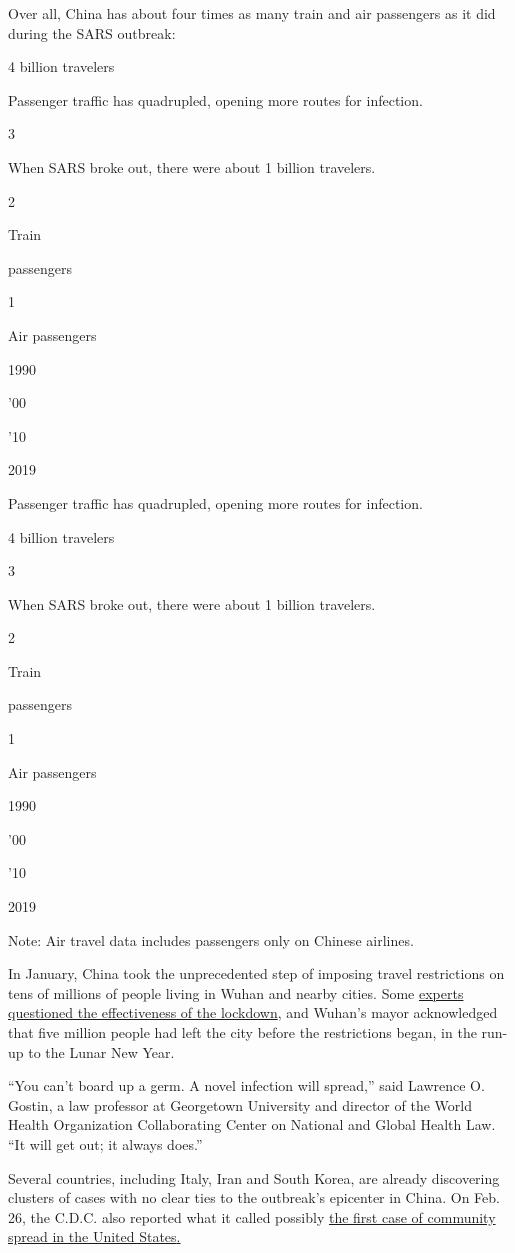 Over all, China has about four times as many train and air passengers as
it did during the SARS outbreak:

4 billion travelers

Passenger traffic has quadrupled, opening more routes for infection.

3

When SARS broke out, there were about 1 billion travelers.

2

Train

passengers

1

Air passengers

1990

'00

'10

2019

Passenger traffic has quadrupled, opening more routes for infection.

4 billion travelers

3

When SARS broke out, there were about 1 billion travelers.

2

Train

passengers

1

Air passengers

1990

'00

'10

2019

Note: Air travel data includes passengers only on Chinese airlines.

In January, China took the unprecedented step of imposing travel
restrictions on tens of millions of people living in Wuhan and nearby
cities. Some
\href{https://www.nytimes.com/2020/01/26/world/asia/coronavirus-wuhan-china-hubei.html}{experts
questioned the effectiveness of the lockdown}, and Wuhan's mayor
acknowledged that five million people had left the city before the
restrictions began, in the run-up to the Lunar New Year.

``You can't board up a germ. A novel infection will spread,'' said
Lawrence O. Gostin, a law professor at Georgetown University and
director of the World Health Organization Collaborating Center on
National and Global Health Law. ``It will get out; it always does.''

Several countries, including Italy, Iran and South Korea, are already
discovering clusters of cases with no clear ties to the outbreak's
epicenter in China. On Feb. 26, the C.D.C. also reported what it called
possibly
\href{https://www.nytimes.com/2020/02/26/health/coronavirus-cdc-usa.html}{the
first case of community spread in the United
States}\href{https://www.nytimes.com/2020/02/26/health/coronavirus-cdc-usa.html}{.}

